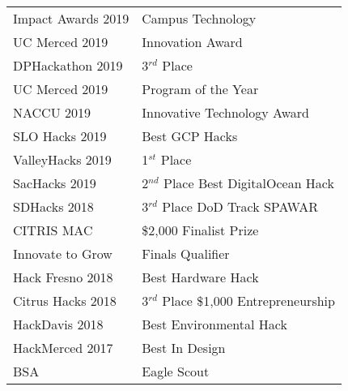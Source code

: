 \documentclass{article}%
\begin{document}
\begin{minipage}{0.38\textwidth}
%
\section*{}%
\label{sec:customboldAwards}%
\begin{tabular}{ll}%
Impact Awards 2019&Campus Technology\\%
\customrowheight%
UC Merced 2019&Innovation Award\\%
\customrowheight%
DPHackathon 2019&3$^{rd}$ Place\\%
\customrowheight%
UC Merced 2019&Program of the Year\\%
\customrowheight%
NACCU 2019&Innovative Technology Award\\%
\customrowheight%
SLO Hacks 2019&Best GCP Hacks\\%
\customrowheight%
ValleyHacks 2019&1$^{st}$ Place\\%
\customrowheight%
SacHacks 2019&\parbox{5cm}{2$^{nd}$ Place \\ Best DigitalOcean Hack}\\%
\customrowheight%
SDHacks 2018&\parbox{5cm}{3$^{rd}$ Place \\ DoD Track SPAWAR}\\%
\customrowheight%
CITRIS MAC&\$2,000 Finalist Prize\\%
\customrowheight%
Innovate to Grow&Finals Qualifier\\%
\customrowheight%
Hack Fresno 2018&Best Hardware Hack\\%
\customrowheight%
Citrus Hacks 2018&\parbox{5cm}{3$^{rd}$ Place \\ \$1,000 Entrepreneurship}\\%
\customrowheight%
HackDavis 2018&Best Environmental Hack\\%
\customrowheight%
HackMerced 2017&Best In Design\\%
\customrowheight%
BSA&Eagle Scout\\%
\end{tabular}

%
\end{minipage}%
\end{document}
